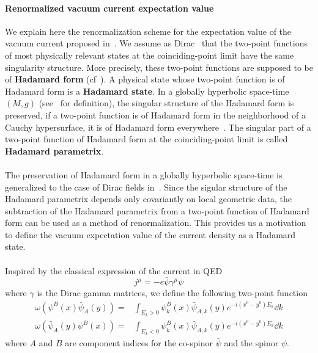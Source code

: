 \paragraph{Renormalized vacuum current expectation value}
We explain here the renormalization scheme for the expectation value of the vacuum current proposed in~\cite{Zahn2015}.
We assume as Dirac~\cite{Dirac1934} that the two-point functions of most physically relevant states at the coinciding-point limit have the same singularity structure.
More precisely, these two-point functions are supposed to be of \textbf{Hadamard form} (cf~\cite{Hollands2014}).
A physical state whose two-point function is of Hadamard form is a \textbf{Hadamard state}.
In a globally hyperbolic space-time $(M,g)$ (see~\cite{Wald2010} for definition), 
the singular structure of the Hadamard form is preserved, 
\ie if a two-point function is of Hadamard form in the neighborhood of a Cauchy hypersurface, it is of Hadamard form everywhere~\cite{Fulling1978}.
The singular part of a two-point function of Hadamard form at the coinciding-point limit is called \textbf{Hadamard parametrix}.  \\\\
%
The preservation of Hadamard form in a globally hyperbolic space-time is generalized to the case of Dirac fields in~\cite{Sahlmann2000}.
Since the sigular structure of the Hadamard parametrix depends only covariantly on local geometric data, the subtraction of the Hadamard parametrix from a two-point function of Hadamard form can be used as a method of renormalization.
This provides us a motivation to define the vacuum expectation value of the current density as a Hadamard state.
\\\\
Inspired by the classical expression of the current in QED
\begin{equation*}
j^\mu = -e\bar{\psi}\gamma^\mu\psi
\end{equation*}
where $\gamma$ is the Dirac gamma matrices,
we define the following two-point function
\begin{equation}\label{vacuum-hadamardstate}
\begin{split}
\omega(\psi^B(x)\bar{\psi}_A(y)) = & \int_{E_k >0} \psi_k^B(x)\bar{\psi}_{A,k}(y)e^{-i(x^0-y^0)E_k} \dd k \\
\omega(\bar{\psi}_A(y)\psi^B(x)) = & \int_{E_k <0} \psi_k^B(x)\bar{\psi}_{A,k}(y)e^{-i(x^0-y^0)E_k} \dd k 
\end{split}
\end{equation}
where $A$ and $B$ are component indices for the co-spinor $\bar{\psi}$ and the spinor $\psi$.
